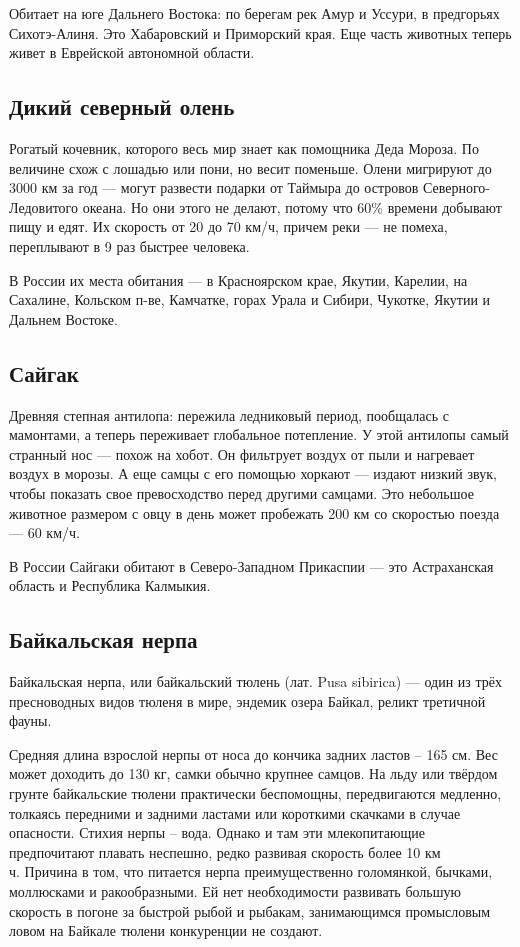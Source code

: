 \documentclass[12pt]{article}
\begin{document}
    Обитает на юге Дальнего Востока: по берегам рек Амур и Уссури, в предгорьях Сихотэ-Алиня. Это Хабаровский и Приморский края. Еще часть животных теперь живет в Еврейской автономной области.

    \subsection{Дикий северный олень}

    Рогатый кочевник, которого весь мир знает как помощника Деда Мороза. По величине схож с лошадью или пони, но весит поменьше. Олени мигрируют до 3000 км за год — могут развести подарки от Таймыра до островов Северного-Ледовитого океана. Но они этого не делают, потому что 60\% времени добывают пищу и едят. Их скорость от 20 до 70 км/ч, причем реки — не помеха, переплывают в 9 раз быстрее человека.

    В России их места обитания — в Красноярском крае, Якутии, Карелии, на Сахалине, Кольском п-ве, Камчатке, горах Урала и Сибири, Чукотке, Якутии и Дальнем Востоке.

    \subsection{Сайгак}

    Древняя степная антилопа: пережила ледниковый период, пообщалась с мамонтами, а теперь переживает глобальное потепление. У этой антилопы самый странный нос — похож на хобот. Он фильтрует воздух от пыли и нагревает воздух в морозы. А еще самцы с его помощью хоркают — издают низкий звук, чтобы показать свое превосходство перед другими самцами. Это небольшое животное размером с овцу в день может пробежать 200 км со скоростью поезда — 60 км/ч.

    В России Сайгаки обитают в Северо-Западном Прикаспии — это Астраханская область и Республика Калмыкия.

    \subsection{Байкальская нерпа}

    Байкальская нерпа, или байкальский тюлень (лат. Pusa sibirica) --- один из трёх пресноводных видов тюленя в мире, эндемик озера Байкал, реликт третичной фауны.

    Средняя длина взрослой нерпы от носа до кончика задних ластов – 165 см. Вес может доходить до 130 кг, самки обычно крупнее самцов. На льду или твёрдом грунте байкальские тюлени практически беспомощны, передвигаются медленно, толкаясь передними и задними ластами или короткими скачками в случае опасности. Стихия нерпы – вода. Однако и там эти млекопитающие предпочитают плавать неспешно, редко развивая скорость более 10 км\\ч. Причина в том, что питается нерпа преимущественно голомянкой, бычками, моллюсками и ракообразными. Ей нет необходимости развивать большую скорость в погоне за быстрой рыбой и рыбакам, занимающимся промысловым ловом на Байкале тюлени конкуренции не создают.
\end{document}
